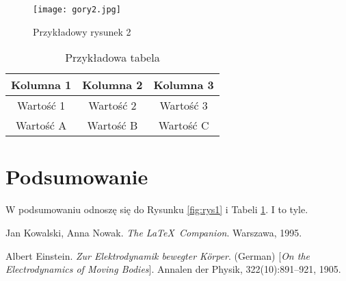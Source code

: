 \documentclass{article}
\begin{document}
\begin{figure}[h]
\centering
\texttt{[image: gory2.jpg]}
\caption{Przykładowy rysunek 2}
\label{fig:rys2}
\end{figure}

\begin{table}[h]
\centering
\begin{tabular}{|c|c|c|}
\hline
Kolumna 1 & Kolumna 2 & Kolumna 3 \\
\hline
Wartość 1 & Wartość 2 & Wartość 3 \\
Wartość A & Wartość B & Wartość C \\
\hline
\end{tabular}
\caption{Przykładowa tabela}
\label{tab:tabela1}
\end{table}
\newpage

\section{Podsumowanie}
W podsumowaniu odnoszę się do Rysunku \ref{fig:rys1} i Tabeli \ref{tab:tabela1}. I to tyle.

\begin{thebibliography}{9}
Jan Kowalski, Anna Nowak. 
\textit{The \LaTeX\ Companion}. 
Warszawa, 1995.
 
Albert Einstein. 
\textit{Zur Elektrodynamik bewegter Körper}. (German) 
[\textit{On the Electrodynamics of Moving Bodies}]. 
Annalen der Physik, 322(10):891–921, 1905.
\end{thebibliography}
\end{document}
